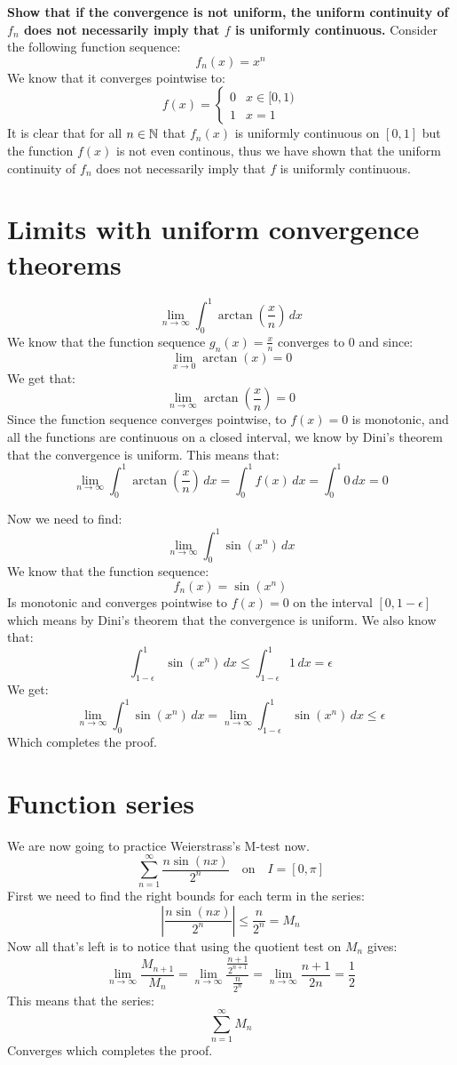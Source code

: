\documentclass[11pt,a4paper]{article}
\begin{document}
	\textbf{Show that if the convergence is not uniform, the uniform
	continuity of $f_n$ does not necessarily imply that $f$ is uniformly
	continuous.}
	Consider the following function sequence: 
	\[
		f_n(x) = x^n
	\]
	We know that it converges pointwise to:
	\[
	f(x) = 
		\begin{cases}
			0 & x\in[0,1) \\
			1 & x = 1
		\end{cases} 
	\]
	It is clear that for all $n\in\mathbb{N}$ that $f_n(x)$ is uniformly continuous
	on $[0,1]$ but the function $f(x)$ is not even continous, thus we 
	have shown that the uniform continuity of $f_n$ does not necessarily 
	imply that $f$ is uniformly continuous.
	
	\newpage
	
	\section{Limits with uniform convergence theorems}
	\[
		\lim_{n\to\infty}{\int_{0}^{1}{\arctan\left(\frac{x}{n}\right)\,dx}}
	\]
	We know that the function sequence $g_n(x) = \frac{x}{n}$ converges 
	to $0$ and since:
	\[
		\lim_{x\to 0}{\arctan(x)} = 0
	\]
	We get that:
	\[
		\lim_{n\to\infty}{\arctan\left(\frac{x}{n}\right)} = 0
	\]
	Since the function sequence converges pointwise, to $f(x) = 0$ is 
	monotonic, and all the functions are continuous on a closed interval, 
	we know by Dini's theorem that the convergence is uniform. 
	This means that:
	\[
		\lim_{n\to\infty}{\int_{0}^{1}{\arctan\left(\frac{x}{n}\right)\,dx}}
		= \int_{0}^{1}{f(x)\,dx} = \int_{0}^{1}{0\,dx} = 0
	\]
	
	\newpage
	
	Now we need to find:
	\[
		\lim_{n\to\infty}{\int_{0}^{1}{\sin(x^n)\,dx}}
	\]
	We know that the function sequence:
	\[
		f_n(x) = \sin(x^n)
	\]
	Is monotonic and converges pointwise to $f(x) = 0$ on the interval
	$[0,1-\epsilon]$ which means by Dini's theorem that the convergence is
	uniform. We also know that:
	\[
		{\int_{1-\epsilon}^{1}{\sin(x^n)\,dx}} \le 
		{\int_{1-\epsilon}^{1}{1\,dx}} = \epsilon
	\]
	We get:
	\[
		\lim_{n\to\infty}{\int_{0}^{1}{\sin(x^n)\,dx}} = 
		\lim_{n\to\infty}\int_{1-\epsilon}^{1}{\sin(x^n)\,dx} \le
		\epsilon
	\]
	Which completes the proof.
	
	\newpage
	
	\section{Function series}
	We are now going to practice Weierstrass's M-test now.
	\[
	\sum_{n=1}^{\infty}{\frac{n\sin(nx)}{2^n}}\quad\text{on}\quad I=[0,\pi]
	\]
	First we need to find the right bounds for each term in the series:
	\[
		\left\vert\frac{n\sin(nx)}{2^n}\right\vert \le \frac{n}{2^n} = M_n
	\]
	Now all that's left is to notice that using the quotient test on $M_n$
	gives:
	\[
		\lim_{n\to\infty}{\frac{M_{n+1}}{M_{n}}} = 
		\lim_{n\to\infty}{\dfrac{\frac{n+1}{2^{n+1}}}{\frac{n}{2^n}}} = 
		\lim_{n\to\infty}{\frac{n+1}{2n}} = \frac{1}{2}
	\]
	This means that the series:
	\[
		\sum_{n=1}^{\infty}{M_n}
	\]
	Converges which completes the proof.
	
\end{document}
